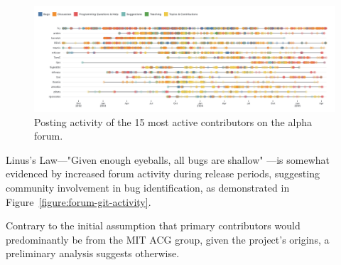 \begin{figure}[h!]
  \centering
  \includegraphics[width=1.0\textwidth]{images/alpha-forum-top15.png}
  \caption{Posting activity of the 15 most active contributors on the alpha forum.}
  \label{fig:processing-alpha-dot}
\end{figure}

\clearpage



Linus's Law—"Given enough eyeballs, all bugs are shallow" \parencite[29]{raymondCathedralBazaar1999}—is somewhat evidenced by increased forum activity during release periods, suggesting community involvement in bug identification, as demonstrated in Figure~\ref{figure:forum-git-activity}.



Contrary to the initial assumption that primary contributors would predominantly be from the MIT ACG group, given the project's origins, a preliminary analysis suggests otherwise.

